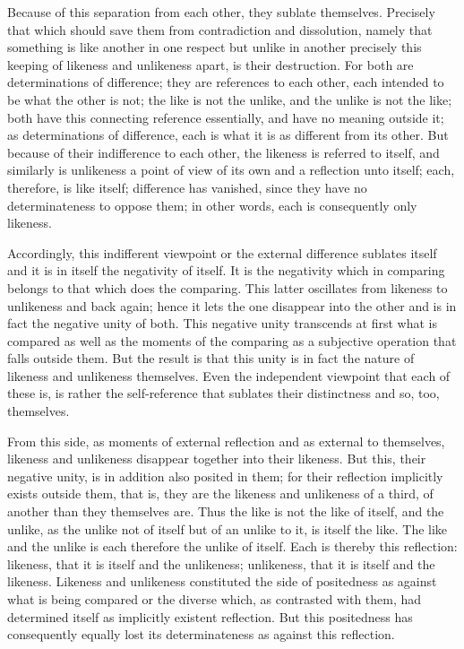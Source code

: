 Because of this separation from each other,
they sublate themselves.
Precisely that which should save them
from contradiction and dissolution,
namely that something is like another in one respect
but unlike in another precisely this keeping of
likeness and unlikeness apart, is their destruction.
For both are determinations of difference;
they are references to each other,
each intended to be what the other is not;
the like is not the unlike,
and the unlike is not the like;
both have this connecting reference essentially,
and have no meaning outside it;
as determinations of difference,
each is what it is as different from its other.
But because of their indifference to each other,
the likeness is referred to itself,
and similarly is unlikeness a point of view of
its own and a reflection unto itself;
each, therefore, is like itself;
difference has vanished, since they have no
determinateness to oppose them;
in other words, each is consequently only likeness.

Accordingly, this indifferent viewpoint
or the external difference sublates itself
and it is in itself the negativity of itself.
It is the negativity which in comparing
belongs to that which does the comparing.
This latter oscillates from likeness
to unlikeness and back again;
hence it lets the one disappear into the other
and is in fact the negative unity of both.
This negative unity transcends at first
what is compared as well as
the moments of the comparing as
a subjective operation that falls outside them.
But the result is that this unity is
in fact the nature of likeness and unlikeness themselves.
Even the independent viewpoint
that each of these is,
is rather the self-reference
that sublates their distinctness
and so, too, themselves.

From this side, as moments of external reflection
and as external to themselves,
likeness and unlikeness disappear together into their likeness.
But this, their negative unity,
is in addition also posited in them;
for their reflection implicitly exists
outside them, that is, they are the likeness and
unlikeness of a third,
of another than they themselves are.
Thus the like is not the like of itself,
and the unlike, as the unlike not of itself
but of an unlike to it,
is itself the like.
The like and the unlike is
each therefore the unlike of itself.
Each is thereby this reflection:
likeness, that it is itself and the unlikeness;
unlikeness, that it is itself and the likeness.
Likeness and unlikeness constituted
the side of positedness as against
what is being compared or the diverse
which, as contrasted with them,
had determined itself as implicitly existent reflection.
But this positedness has consequently equally
lost its determinateness as against this reflection.

